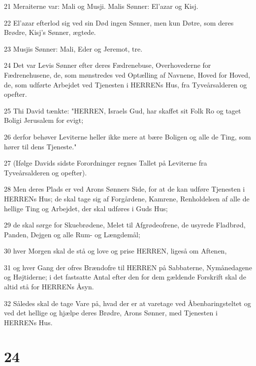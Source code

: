 \par 21 Meraiterne var: Mali og Musji. Malis Sønner: El'azar og Kisj.
\par 22 El'azar efterlod sig ved sin Død ingen Sønner, men kun Døtre, som deres Brødre, Kisj's Sønner, ægtede.
\par 23 Musjis Sønner: Mali, Eder og Jeremot, tre.
\par 24 Det var Levis Sønner efter deres Fædrenebuse, Overhovederne for Fædrenehusene, de, som mønstredes ved Optælling af Navnene, Hoved for Hoved, de, som udførte Arbejdet ved Tjenesten i HERRENs Hus, fra Tyveårsalderen og opefter.
\par 25 Thi David tænkte: "HERREN, Israels Gud, har skaffet sit Folk Ro og taget Boligi Jerusalem for evigt;
\par 26 derfor behøver Leviterne heller ikke mere at bære Boligen og alle de Ting, som hører til dens Tjeneste."
\par 27 (Ifølge Davids sidste Forordninger regnes Tallet på Leviterne fra Tyveårsalderen og opefter).
\par 28 Men deres Plads er ved Arons Sønners Side, for at de kan udføre Tjenesten i HERRENs Hus; de skal tage sig af Forgårdene, Kamrene, Renholdelsen af alle de hellige Ting og Arbejdet, der skal udføres i Guds Hus;
\par 29 de skal sørge for Skuebrødene, Melet til Afgrødeofrene, de usyrede Fladbrød, Panden, Dejgen og alle Rum- og Længdemål;
\par 30 hver Morgen skal de stå og love og prise HERREN, ligeså om Aftenen,
\par 31 og hver Gang der ofres Brændofre til HERREN på Sabbaterne, Nymånedagene og Højtiderne; i det fastsatte Antal efter den for dem gældende Forskrift skal de altid stå for HERRENs Åsyn.
\par 32 Således skal de tage Vare på, hvad der er at varetage ved Åbenbaringsteltet og ved det hellige og hjælpe deres Brødre, Arons Sønner, med Tjenesten i HERRENs Hus.

\chapter{24}

